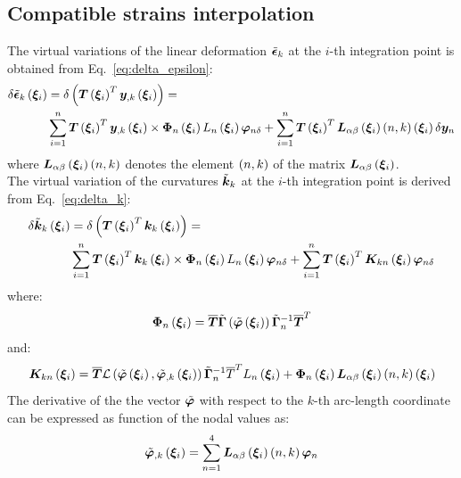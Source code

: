 \subsection{Compatible strains interpolation}
The virtual variations of the linear deformation $\tilde{\bm{\epsilon} }_k $ at the $i$-th integration point is obtained from Eq.~\ref{eq:delta_epsilon}:
\begin{equation}
\begin{split}
\delta \tilde{\bm{\epsilon} }_k \left(  \bm{ \xi }_{ i }  \right) & = \delta \left(  \bm{T}\left(  \bm{ \xi }_{ i }  \right)^T \bm{y}_{,k} \left(  \bm{ \xi }_{ i }  \right)  \right) = \\
& \sum_{i=1}^n \bm{T}\left(  \bm{ \xi }_{ i }  \right)^T \bm{y}_{,k}\left(  \bm{ \xi }_{ i }  \right) \times \bm{\Phi}_{n} \left(  \bm{ \xi }_{ i }  \right) L_n \left(  \bm{ \xi }_{ i }  \right) \bm{\varphi}_{n \delta} + \sum_{i=1}^n \bm{T}\left(  \bm{ \xi }_{ i }  \right)^T \bm{L}_{\alpha \beta} \left(  \bm{ \xi }_{ i }  \right) \left(  n, k  \right) \left(  \bm{ \xi }_{ i }  \right) \delta \bm{y}_{n}
\end{split}
\label{eq:delta_epsilon_i}
\end{equation}
where $\bm{L}_{\alpha \beta} \left(  \bm{ \xi }_{ i }  \right) \left(  n, k  \right)$ denotes the element $\left( n, k \right)$ of the matrix $\bm{L}_{\alpha \beta} \left(  \bm{ \xi }_{ i }  \right)$.\\
The  virtual variation of the curvatures $\tilde{\bm{k} }_k$ at the $i$-th integration point is derived from Eq.~\ref{eq:delta_k}:
\begin{equation}
\begin{split}
\delta \tilde{\bm{k} }_k \left(  \bm{ \xi }_{ i }  \right) & = \delta \left(  \bm{T}\left(  \bm{ \xi }_{ i }  \right)^T \bm{k}_k \left(  \bm{ \xi }_{ i }  \right) \right) =  \\
& \sum_{i=1}^n \bm{T}\left(  \bm{ \xi }_{ i }  \right)^T \bm{k}_k\left(  \bm{ \xi }_{ i }  \right) \times \bm{\Phi}_n\left(  \bm{ \xi }_{ i }  \right) L_n\left(  \bm{ \xi }_{ i }  \right) \bm{\varphi}_{n \delta} + \sum_{i=1}^n \bm{T}\left(  \bm{ \xi }_{ i }  \right)^T \bm{K}_{kn}\left(  \bm{ \xi }_{ i }  \right) \bm{\varphi}_{n \delta}
\end{split}
\label{eq:delta_k_i}
\end{equation}
where:
\begin{equation}
\bm{\Phi}_{n} \left(  \bm{ \xi }_{ i }  \right) = \overline{\bm{T}}  \tilde{ \bm{\Gamma} } \left(  \tilde{\bm{\varphi}} \left(  \bm{ \xi }_{ i }  \right)  \right) \tilde{ \bm{\Gamma} }_n^{-1} \overline{\bm{T}}^T
\end{equation}
and:
\begin{equation}
\bm{K}_{kn} \left(  \bm{ \xi }_{ i }  \right) =
\overline{\bm{T}} \mathcal{L} \left(  \tilde{\bm{\varphi}}\left(  \bm{ \xi }_{ i }  \right), \tilde{\bm{\varphi}}_{,k}\left(  \bm{ \xi }_{ i }  \right)  \right) \tilde{ \bm{\Gamma} }_{n}^{-1} \overline{T}^T L_n\left(  \bm{ \xi }_{ i }  \right) + \bm{\Phi}_{n}\left(  \bm{ \xi }_{ i }  \right) \bm{L}_{\alpha \beta} \left(  \bm{ \xi }_{ i }  \right) \left(  n, k  \right) \left(  \bm{ \xi }_{ i }  \right)
\end{equation}
The derivative of the the vector $\tilde{\bm{\varphi}}$ with respect to the $k$-th arc-length coordinate can be expressed as function of the nodal values as:
\begin{equation}
\tilde{ \bm{ \varphi } }_{,k} \left(  \bm{ \xi }_{ i }  \right)  =
\sum_{n=1}^4 \bm{L}_{\alpha \beta} \left(  \bm{ \xi }_{ i }  \right) \left(  n, k  \right) \bm{\varphi}_{n}
\end{equation}
